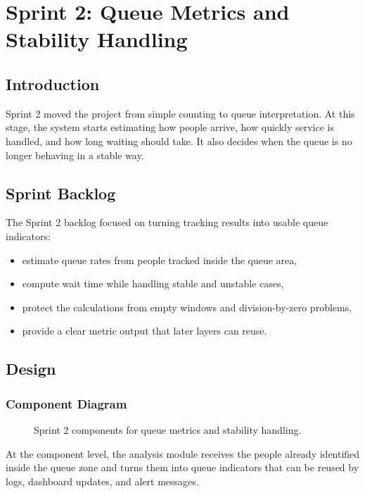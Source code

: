 \chapter{Sprint 2: Queue Metrics and Stability Handling}
\chaptertoc

\clearpage

\section{Introduction}
Sprint 2 moved the project from simple counting to queue interpretation. At this stage, the system starts estimating how people arrive, how quickly service is handled, and how long waiting should take. It also decides when the queue is no longer behaving in a stable way.

\section{Sprint Backlog}
The Sprint 2 backlog focused on turning tracking results into usable queue indicators:
\begin{itemize}
    \item estimate queue rates from people tracked inside the queue area,
    \item compute wait time while handling stable and unstable cases,
    \item protect the calculations from empty windows and division-by-zero problems,
    \item provide a clear metric output that later layers can reuse.
\end{itemize}

\section{Design}

\subsection{Component Diagram}
\begin{figure}[H]
    \centering
    \caption{Sprint 2 components for queue metrics and stability handling.}
    \label{fig:sprint2_component}
\end{figure}

At the component level, the analysis module receives the people already identified inside the queue zone and turns them into queue indicators that can be reused by logs, dashboard updates, and alert messages.

